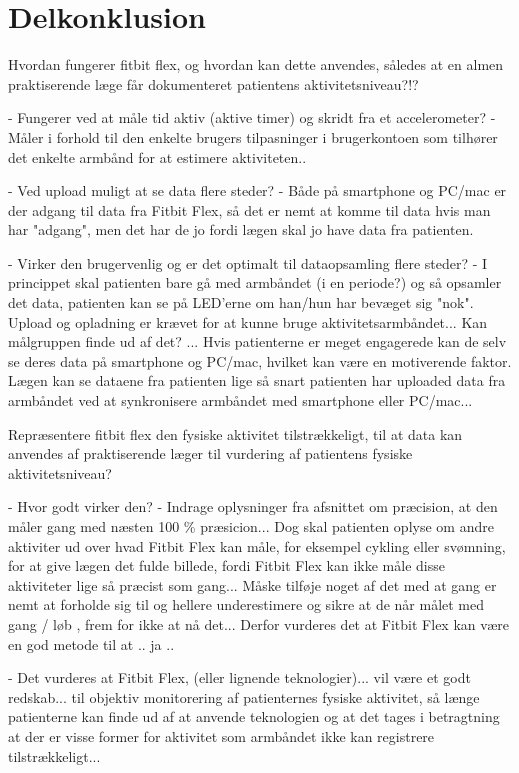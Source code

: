 \section{Delkonklusion}

Hvordan fungerer fitbit flex, og hvordan kan dette anvendes, således at en almen praktiserende læge får dokumenteret patientens aktivitetsniveau?!?
 
- Fungerer ved at måle tid aktiv (aktive timer) og skridt fra et accelerometer?
	- Måler i forhold til den enkelte brugers tilpasninger i brugerkontoen som tilhører det enkelte armbånd for at estimere aktiviteten..

- Ved upload muligt at se data flere steder?
	- Både på smartphone og PC/mac er der adgang til data fra Fitbit Flex, så det er nemt at komme til data hvis man har "adgang", men det har de jo fordi lægen skal jo have data fra patienten.
	
- Virker den brugervenlig og er det optimalt til dataopsamling flere steder?
	- I princippet skal patienten bare gå med armbåndet (i en periode?) og så opsamler det data, patienten kan se på LED'erne om han/hun har bevæget sig "nok". Upload og opladning er krævet for at kunne bruge aktivitetsarmbåndet... Kan målgruppen finde ud af det? ... Hvis patienterne er meget engagerede kan de selv se deres data på smartphone og PC/mac, hvilket kan være en motiverende faktor. Lægen kan se dataene fra patienten lige så snart patienten har uploaded data fra armbåndet ved at synkronisere armbåndet med smartphone eller PC/mac...

Repræsentere fitbit flex den fysiske aktivitet tilstrækkeligt, til at data kan anvendes af praktiserende læger til vurdering af patientens fysiske aktivitetsniveau?

- Hvor godt virker den?
	- Indrage oplysninger fra afsnittet om præcision, at den måler gang med næsten 100 \% præsicion... Dog skal patienten oplyse om andre aktiviter ud over hvad Fitbit Flex kan måle, for eksempel cykling eller svømning, for at give lægen det fulde billede, fordi Fitbit Flex kan ikke måle disse aktiviteter lige så præcist som gang... Måske tilføje noget af det med at gang er nemt at forholde sig til og hellere underestimere og sikre at de når målet med gang / løb , frem for ikke at nå det... Derfor vurderes det at Fitbit Flex kan være en god metode til at .. ja ..
	
- Det vurderes at Fitbit Flex, (eller lignende teknologier)... vil være et godt redskab... til objektiv monitorering af patienternes fysiske aktivitet, så længe patienterne kan finde ud af at anvende teknologien og at det tages i betragtning at der er visse former for aktivitet som armbåndet ikke kan registrere tilstrækkeligt... 